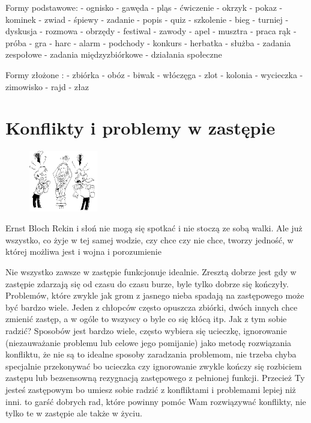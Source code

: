 Formy podstawowe:
-  ognisko	-  gawęda	- pląs 		- ćwiczenie
- okrzyk 	-  pokaz		- kominek	- zwiad
-  śpiewy	-  zadanie	- popis		- quiz
-  szkolenie	-  bieg		- turniej		- dyskusja
- rozmowa	-  obrzędy	- festiwal	- zawody
-  apel		-  musztra	- praca rąk	- próba
- gra		- harc		- alarm		-  podchody
- konkurs	- herbatka	- służba
- zadania zespołowe		- zadania międzyzbiórkowe
- działania społeczne			

Formy złożone :
-  zbiórka	-  obóz		-  biwak		-  włóczęga
-  zlot		-  kolonia	-  wycieczka	-  zimowisko
-  rajd		-  złaz


\section{Konflikty i problemy w zastępie}



\begin{figure}
\begin{center}
\includegraphics[width=3cm]{grafiki/konflikty.png}
\end{center}
\end{figure}\begin{aquote}{Ernst Bloch}
Rekin i słoń nie mogą się spotkać i nie stoczą ze sobą walki. Ale już wszystko, co żyje w tej samej wodzie, czy chce czy nie chce, tworzy jedność, w której możliwa jest i wojna i porozumienie
 \end{aquote}


Nie  wszystko  zawsze w  zastępie  funkcjonuje idealnie. 
Zresztą  dobrze  jest  gdy  w  zastępie  zdarzają się od czasu do  czasu burze,  byle tylko  dobrze  się kończyły.  Problemów, które  zwykle  jak  grom z  jasnego nieba spadają na zastępowego może być bardzo wiele. Jeden z chłopców często opuszcza  zbiórki, dwóch innych chce zmienić  zastęp,  a w ogóle to wszyscy o byle co  się kłócą itp.
	Jak z tym sobie radzić?  Sposobów jest bardzo wiele, często wybiera się ucieczkę, ignorowanie (niezauważanie problemu lub celowe jego pomijanie) jako metodę rozwiązania konfliktu, że nie są  to idealne  sposoby  zaradzania  problemom, nie trzeba chyba  specjalnie  przekonywać bo ucieczka czy ignorowanie zwykle kończy się rozbiciem zastępu lub bezsensowną rezygnacją zastępowego z pełnionej funkcji. Przecież Ty jesteś zastępowym bo umiesz sobie radzić z konfliktami  i  problemami lepiej niż inni. to garść dobrych rad, które powinny pomóc Wam rozwiązywać  konflikty, nie tylko te w zastępie ale także w  życiu.

